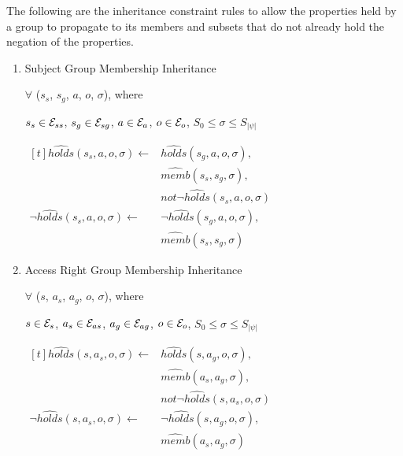 \documentclass[11pt, twocolumn]{article}
\begin{document}
            The following are the inheritance constraint rules to allow the
            properties held by a group to propagate to its members and
            subsets that do not already hold the negation of the properties.

            \begin{enumerate}
              \item
                Subject Group Membership Inheritance

                $\forall$ ($s_{s}$, $s_{g}$, $a$, $o$, $\sigma$), where

                $s_{s} \in {\cal E}_{ss}$,
                $s_{g} \in {\cal E}_{sg}$,
                $a \in {\cal E}_{a}$,
                $o \in {\cal E}_{o}$,
                $S_{0}{\leq}{\sigma}{\leq}S_{|\psi|}$

                \begin{math}
                  \begin{aligned}[t]
                    \hat{holds}(s_{s}, a, o, \sigma) \leftarrow &
                    \hat{holds}(s_{g}, a, o, \sigma), \\
                    & \hat{memb}(s_{s}, s_{g}, \sigma), \\
                    & not \lnot \hat{holds}(s_{s}, a, o, \sigma) \\
                    \lnot \hat{holds}(s_{s}, a, o, \sigma) \leftarrow &
                    \lnot \hat{holds}(s_{g}, a, o, \sigma), \\
                    & \hat{memb}(s_{s}, s_{g}, \sigma)
                  \end{aligned}
                \end{math}

              \item
                Access Right Group Membership Inheritance

                $\forall$ ($s$, $a_{s}$, $a_{g}$, $o$, $\sigma$), where

                $s \in {\cal E}_{s}$,
                $a_{s} \in {\cal E}_{as}$,
                $a_{g} \in {\cal E}_{ag}$,
                $o \in {\cal E}_{o}$,
                $S_{0}{\leq}{\sigma}{\leq}S_{|\psi|}$

                \begin{math}
                  \begin{aligned}[t]
                    \hat{holds}(s, a_{s}, o, \sigma) \leftarrow &
                    \hat{holds}(s, a_{g}, o, \sigma), \\
                    & \hat{memb}(a_{s}, a_{g}, \sigma), \\
                    & not \lnot \hat{holds}(s, a_{s}, o, \sigma) \\
                    \lnot \hat{holds}(s, a_{s}, o, \sigma) \leftarrow &
                    \lnot \hat{holds}(s, a_{g}, o, \sigma), \\
                    & \hat{memb}(a_{s}, a_{g}, \sigma)
                  \end{aligned}
                \end{math}


\end{enumerate}
\end{document}
